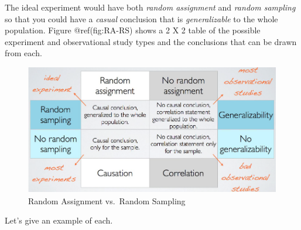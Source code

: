 \documentclass[
  letterpaper,
  DIV=11,
  numbers=noendperiod]{scrreprt}
\theoremstyle{definition}
\theoremstyle{remark}
\begin{document}
The ideal experiment would have both \emph{random assignment} and
\emph{random sampling} so that you could have a \emph{casual} conclusion
that is \emph{generalizable} to the whole population. Figure
@ref(fig:RA-RS) shows a 2 X 2 table of the possible experiment and
observational study types and the conclusions that can be drawn from
each.

\begin{figure}

{\centering \includegraphics[width=1.1\textwidth,height=\textheight]{images/RA_vs_RS.png}

}

\caption{Random Assignment vs.~Random Sampling}

\end{figure}

Let's give an example of each.
\end{document}
